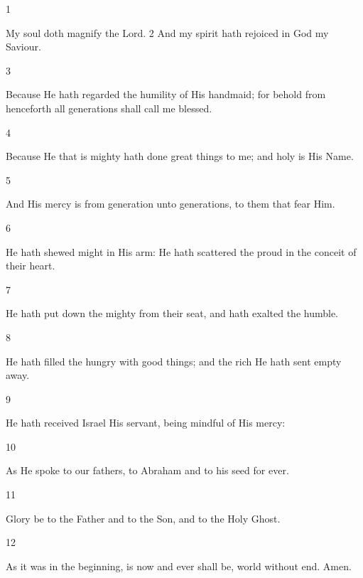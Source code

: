 {\parskip=0mm

\parbox{1em}{1} My soul doth magnify the Lord.
2 And my spirit hath rejoiced in God my Saviour. 

\pointorig


\parbox{1em}{3} Because He hath regarded the humility of His handmaid; for behold from henceforth all generations shall call me blessed.

\parbox{1em}{4} Because He that
is mighty hath done great things to me; and holy is His Name. 

\parbox{1em}{5} And His mercy is from generation unto generations, to them
that fear Him.


\parbox{1em}{6} He hath shewed might in His arm: He hath scattered the proud in the conceit of their heart. 

\parbox{1em}{7} He hath put down the mighty from their seat, and hath exalted the humble. 

\parbox{1em}{8} He hath filled the hungry with good things; and the rich He hath
sent empty away. 

\parbox{1em}{9} He hath received Israel His servant, being mindful of His mercy: 

\parbox{1em}{10} As He spoke to our fathers, to
Abraham and to his seed for ever.

\parbox{1em}{11}Glory be to the Father and to the Son, and to the Holy Ghost.

\parbox{1em}{12}As it was in the beginning, is now and ever shall be, world without end.  Amen.


}


